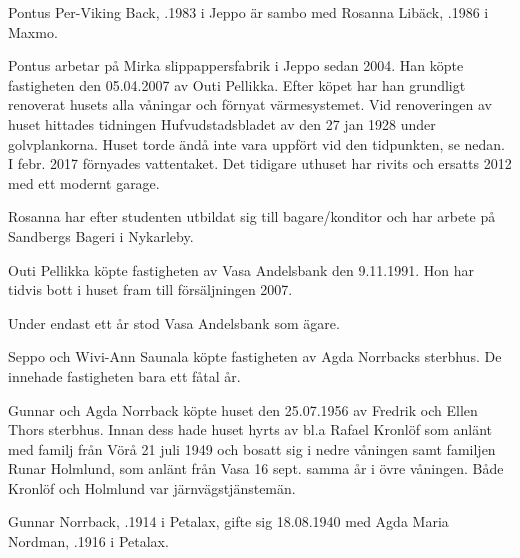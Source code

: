 Pontus Per-Viking Back, .1983 i Jeppo är sambo med Rosanna Libäck, .1986 i Maxmo.
\begin{jhchildren}
  \item {}
  \item {}
\end{jhchildren}

Pontus arbetar på Mirka slippappersfabrik i Jeppo sedan 2004. Han köpte fastigheten den 05.04.2007 av Outi Pellikka. Efter köpet har han grundligt renoverat husets alla våningar och förnyat värmesystemet. Vid renoveringen av huset hittades tidningen Hufvudstadsbladet av	den 27 jan 1928 under golvplankorna. Huset torde ändå inte vara	uppfört vid den tidpunkten, se nedan. I febr. 2017 förnyades vattentaket. Det tidigare uthuset har rivits och ersatts 2012 med ett modernt garage.

Rosanna har efter studenten utbildat sig till bagare/konditor och	har arbete på Sandbergs Bageri i Nykarleby.



Outi Pellikka köpte fastigheten av Vasa Andelsbank den 9.11.1991. Hon har tidvis bott i huset fram till försäljningen 2007.\jhvspace{}


Under endast ett år stod Vasa Andelsbank som ägare.\jhvspace{}


Seppo och Wivi-Ann Saunala köpte fastigheten av Agda Norrbacks sterbhus. De innehade fastigheten bara ett fåtal år.\jhvspace{}


Gunnar och Agda Norrback köpte huset den 25.07.1956 av Fredrik och Ellen Thors sterbhus. Innan dess hade huset hyrts av bl.a Rafael Kronlöf som anlänt med familj från Vörå 21 juli 1949 och bosatt sig i	nedre våningen samt familjen Runar Holmlund, som anlänt från Vasa 16 sept. samma år i övre våningen. Både Kronlöf och Holmlund var järnvägstjänstemän.

Gunnar Norrback, .1914 i Petalax, gifte sig 18.08.1940 med Agda Maria Nordman, .1916 i Petalax.
\begin{jhchildren}
  \item {}
  \item {}
\end{jhchildren}

